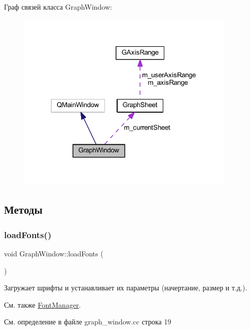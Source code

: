 Граф связей класса Graph\+Window\+:
\nopagebreak
\begin{figure}[H]
\begin{center}
\leavevmode
\includegraphics[width=295pt]{class_graph_window__coll__graph}
\end{center}
\end{figure}


\subsection{Методы}
\hypertarget{class_graph_window_ad4d4842869a043556a275ba06acd816b}{}\label{class_graph_window_ad4d4842869a043556a275ba06acd816b} 
\subsubsection{\texorpdfstring{load\+Fonts()}{loadFonts()}}
{\footnotesize\ttfamily void Graph\+Window\+::load\+Fonts (\begin{DoxyParamCaption}{ }\end{DoxyParamCaption})\hspace{0.3cm}{\ttfamily [private]}}



Загружает шрифты и устанавливает их параметры (начертание, размер и т.\+д.). 

\begin{DoxySeeAlso}{См. также}
\hyperlink{class_font_manager}{Font\+Manager}. 
\end{DoxySeeAlso}


См. определение в файле graph\+\_\+window.\+cc строка 19


